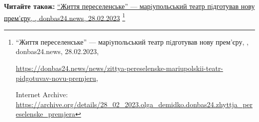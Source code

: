  
 
 
 
 

\def\pubIA{https://archive.org/details/28_02_2023.olga_demidko.donbas24.zhyttja_pereselenske_premjera}
\def\pubTitle{\enquote{Життя переселенське} — марiупольський театр пiдготував нову прем'єру}
\def\pubDate{28.02.2023}
\def\pubOrigin{https://donbas24.news/news/zittya-pereselenske-mariupolskii-teatr-pidgotuvav-novu-premjeru}
\def\pubAuthor{\pubAuthorDemidko}
\def\pubSite{donbas24.news}

\textbf{Читайте також:} \href{\pubIA}{%
\pubTitle, \pubAuthor, \pubSite, \pubDate}%
\footnote{\pubTitle, \pubAuthor, \pubSite, \pubDate, \par\url{\pubOrigin}, \par Internet Archive: \url{\pubIA}}

